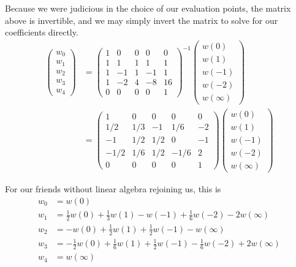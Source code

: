 \documentclass[psamsfonts,reqno]{amsart}
\theoremstyle{definition}
\theoremstyle{remark}
\numberwithin{equation}{section}
\begin{document}
Because we were judicious in the choice of our evaluation points, the matrix above is invertible, and we may simply invert the matrix to solve for our coefficients directly.
\begin{align*}
	\begin{pmatrix}
		w_0 \\
		w_1 \\
		w_2 \\
		w_3 \\
		w_4		
	\end{pmatrix}
	& =
	\begin{pmatrix}
		1 & 0 & 0 & 0 & 0 \\
		1 & 1 & 1 & 1 & 1 \\
		1 & -1 & 1 & -1 & 1 \\
		1 & -2 & 4 & -8 & 16 \\
		0 & 0 & 0 & 0 & 1
	\end{pmatrix}^{-1}
	\begin{pmatrix}
		w(0) \\ 
		w(1) \\
		w(-1) \\
		w(-2) \\
		w(\infty)
	\end{pmatrix}
	\\
	&=
	\begin{pmatrix}
		1 & 0 & 0 & 0 & 0 \\
		1/2 & 1/3 & -1 & 1/6 & -2 \\
		-1 & 1/2 & 1/2 & 0 & -1 \\
		-1/2 & 1/6 & 1/2 & -1/6 & 2 \\
		0 & 0 & 0 & 0 & 1
	\end{pmatrix}
	\begin{pmatrix}
		w(0) \\ 
		w(1) \\
		w(-1) \\
		w(-2) \\
		w(\infty)
	\end{pmatrix}	
\end{align*}

For our friends without linear algebra rejoining us, this is
\begin{align*}
	w_0 &= w(0) \\
	w_1 &= \frac{1}{2}w(0) + \frac{1}{3}w(1) - w(-1) + \frac{1}{6}w(-2) -2w(\infty) \\
	w_2 &= -w(0) + \frac{1}{2}w(1) + \frac{1}{2}w(-1) -w(\infty) \\
	w_3 &= -\frac{1}{2}w(0) + \frac{1}{6}w(1) + \frac{1}{2}w(-1) - \frac{1}{6}w(-2) + 2w(\infty) \\
	w_4 &= w(\infty)
\end{align*}
\end{document}
